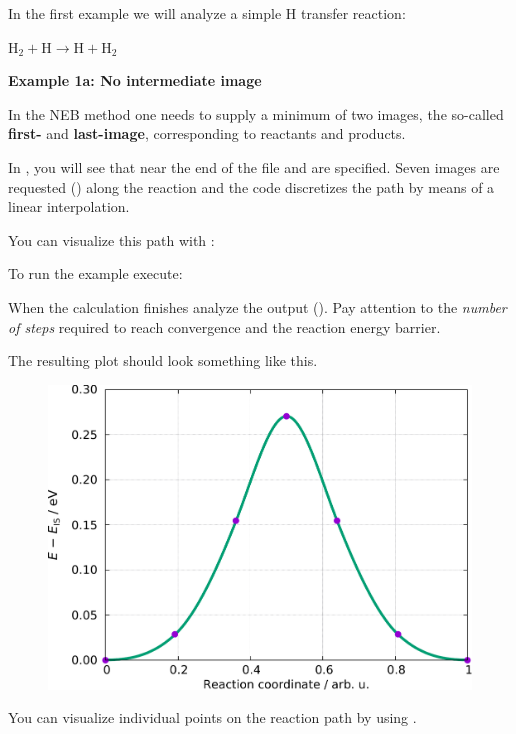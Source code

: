 \documentclass[landscape]{foils}
\begin{document}
In the first example we will analyze a simple H transfer reaction:
\begin{center}
{\large $\mathrm{H_2 + H \rightarrow H + H_2}$}
\end{center}
{\bf Example 1a: No intermediate image}

In the NEB method one needs to supply a minimum of two images, the
so-called {\bf first-} and {\bf last-image}, corresponding to
reactants and products.

In , you will see that near the end of the file
 and  are specified. Seven
images are requested () along the
reaction and the  code discretizes the path
by means of a linear interpolation.

You can visualize this path with :


To run the example execute:


When the calculation finishes analyze the output
(). Pay attention to the {\em number of steps} required
to reach convergence and the reaction energy barrier.


The resulting plot should look something like this.
\begin{figure}
  \centering
    \includegraphics[width=14cm]{figs/H2+H-NEB-path.pdf}
\end{figure}

You can visualize individual points on the reaction path by using .
\end{document}
